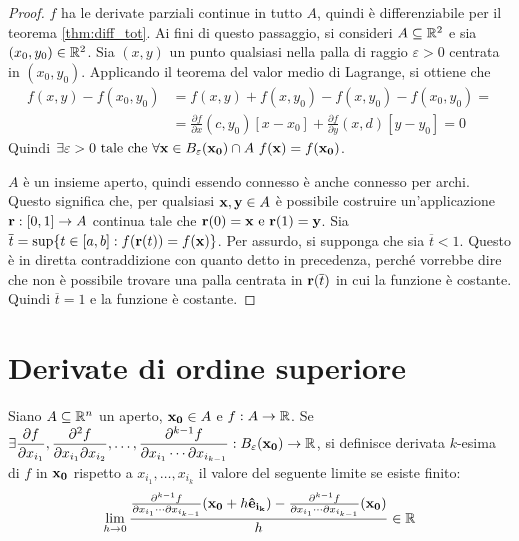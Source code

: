 \begin{proof}
    $f$ ha le derivate parziali continue in tutto $A$, quindi è differenziabile per il teorema \ref{thm:diff_tot}. Ai fini di questo passaggio, si consideri $A\subseteq\mathbb{R}^2$ e sia $(x_0,y_0)\in\mathbb{R}^2$. Sia $(x,y)$ un punto qualsiasi nella palla di raggio $\varepsilon>0$ centrata in $(x_0,y_0)$. Applicando il teorema del valor medio di Lagrange, si ottiene che
    \begin{align*}
        f(x,y)-f(x_0,y_0)&=f(x,y)+f(x,y_0)-f(x,y_0)-f(x_0,y_0)=\\
        &=\frac{\partial f}{\partial x}(c,y_0)[x-x_0]+\frac{\partial f}{\partial y}(x,d)[y-y_0]=0
    \end{align*}
    Quindi $\exists \varepsilon > 0 \text{ tale che } \forall \vb{x}\in B_\varepsilon(\vb{x_0})\cap A\ f(\vb{x})=f(\vb{x_0})$.
    
    $A$ è un insieme aperto, quindi essendo connesso è anche connesso per archi. Questo significa che, per qualsiasi $\vb{x},\vb{y} \in A$ è possibile costruire un'applicazione $\vb{r}:[0,1]\to A$ continua tale che $\vb{r}(0)=\vb{x} \text{ e } \vb{r}(1)=\vb{y}$. Sia $\overline{t}=\sup\{t \in [a,b]:f(\vb{r}(t))=f(\vb{x})\}$. Per assurdo, si supponga che sia $\overline{t}<1$. Questo è in diretta contraddizione con quanto detto in precedenza, perché vorrebbe dire che non è possibile trovare una palla centrata in $\vb{r}(\overline{t})$ in cui la funzione è costante. Quindi $\overline{t}=1$ e la funzione è costante.
\end{proof}

\section{Derivate di ordine superiore}

\begin{definition}
    Siano $A \subseteq \mathbb{R}^n$ un aperto, $\vb{x_0} \in A$ e $f:A \to \mathbb{R}$. Se $\displaystyle \exists \frac{\partial f}{\partial x_{i_1}}, \frac{\partial^2 f}{\partial x_{i_1} \partial x_{i_2}},\dots,\frac{\partial ^{k-1}f}{\partial x_{i_1} \cdots \partial x_{i_{k-1}}} : B_\varepsilon(\vb{x_0}) \to \mathbb{R}$, si definisce derivata $k$-esima di $f$ in $\vb{x_0}$ rispetto a $x_{i_1},\dots,x_{i_{k}}$ il valore del seguente limite se esiste finito:
    $$
        \lim_{h\to 0}\frac{\frac{\partial^{k-1}f}{\partial x_{i_1}\cdots \partial x_{i_{k-1}}}(\vb{x_0}+ h \vb{\hat{e}_{i_k}})- \frac{\partial^{k-1}f}{\partial x_{i_1}\cdots \partial x_{i_{k-1}}}(\vb{x_0})}{h} \in \mathbb{R}
    $$
\end{definition}

